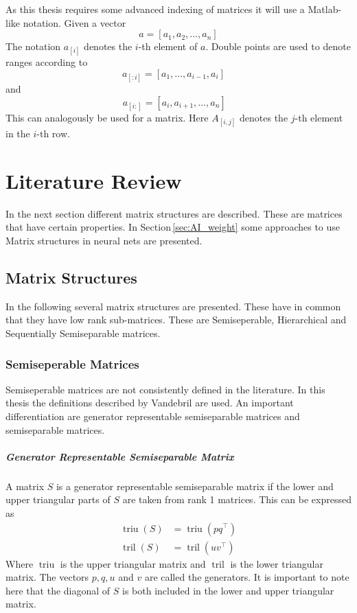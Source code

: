\documentclass[doctype=mastersthesis,BCOR=15mm,biblatex]{ldvbook}%
\DeclareMathOperator{\triu}{triu}
\DeclareMathOperator{\tril}{tril}
\begin{document}
As this thesis requires some advanced indexing of matrices it will use a Matlab-like notation.
Given a vector 
\begin{equation}
	a = [a_1, a_2, \dots ,a_n]
\end{equation}
The notation $a_{[i]}$ denotes the $i$-th element of $a$.
Double points are used to denote ranges according to
\begin{equation}
a_{[:i]} = [a_1, \dots ,a_{i-1},a_i]\phantom{a_n}
\end{equation}
and 
\begin{equation}
a_{[i:]} = [a_i, a_{i+1}, \dots ,a_n]\phantom{a_i}
\end{equation}
This can analogously be used for a matrix. Here $A_{[i,j]}$ denotes the $j$-th element in the $i$-th row.


\chapter{Literature Review}\label{chap:lit}
In the next section different matrix structures are described.
These are matrices that have certain properties.
In Section\,\ref{sec:AI_weight} some approaches to use Matrix structures in neural nets are presented.




\section{Matrix Structures}\label{sec:mat_structures}
In the following several matrix structures are presented.
These have in common that they have low rank sub-matrices.
These are Semiseperable, Hierarchical and Sequentially Semiseparable matrices.

\subsection{Semiseperable Matrices}
Semiseperable matrices are not consistently defined in the literature. 
In this thesis the definitions described by Vandebril \cite{vandebril_bibliography_2005,vandebril_matrix_2007} are used.
An important differentiation are generator representable semiseparable matrices and semiseparable matrices.
\paragraph{Generator Representable Semiseparable Matrix}
A matrix $S$ is a generator representable semiseparable matrix if the lower and upper triangular parts of $S$ are taken from rank 1 matrices.
This can be expressed as 
\begin{align}
	\triu(S) &= \triu(pq^\top)\\
	\tril(S) &= \tril(uv^\top)
\end{align}
Where $\triu$ is the upper triangular matrix and $\tril$ is the lower triangular matrix. The vectors $p,q,u$ and $v$ are called the generators.
It is important to note here that the diagonal of $S$ is both included in the lower and upper triangular matrix.
\end{document}
